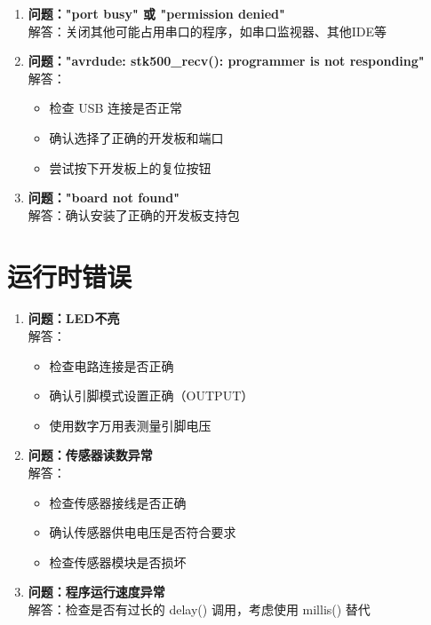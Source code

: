 \documentclass[12pt,UTF8]{ctexbook}
\begin{document}
\begin{enumerate}
    \item \textbf{问题："port busy" 或 "permission denied"}
    \\解答：关闭其他可能占用串口的程序，如串口监视器、其他IDE等
    
    \item \textbf{问题："avrdude: stk500_recv(): programmer is not responding"}
    \\解答：
    \begin{itemize}
        \item 检查 USB 连接是否正常
        \item 确认选择了正确的开发板和端口
        \item 尝试按下开发板上的复位按钮
    \end{itemize}
    
    \item \textbf{问题："board not found"}
    \\解答：确认安装了正确的开发板支持包
\end{enumerate}

\section{运行时错误}

\begin{enumerate}
    \item \textbf{问题：LED不亮}
    \\解答：
    \begin{itemize}
        \item 检查电路连接是否正确
        \item 确认引脚模式设置正确（OUTPUT）
        \item 使用数字万用表测量引脚电压
    \end{itemize}
    
    \item \textbf{问题：传感器读数异常}
    \\解答：
    \begin{itemize}
        \item 检查传感器接线是否正确
        \item 确认传感器供电电压是否符合要求
        \item 检查传感器模块是否损坏
    \end{itemize}
    
    \item \textbf{问题：程序运行速度异常}
    \\解答：检查是否有过长的 delay() 调用，考虑使用 millis() 替代
\end{enumerate}
\end{document}
